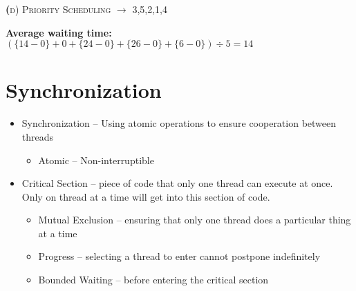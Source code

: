 \documentclass{article}
\newcommand{\smallcaps}[1]{\textsc{\textbf #1}\\}
\begin{document}
    \begin{center}
      \smallcaps{(d) Priority Scheduling $\to$ 3,5,2,1,4}

      \textbf{Average waiting time:} $(\{14 - 0\} + 0 + \{24 - 0\} + \{26 - 0\} + \{6 - 0\}) \div 5 = 14$ \\
    \end{center}

    \pagebreak

    \section*{Synchronization}

    \begin{itemize}
      \item {\color{blue} Synchronization} -- Using atomic operations to ensure cooperation between threads
      \begin{itemize}
        \item {\color{orange} Atomic} -- Non-interruptible
      \end{itemize}
      \item {\color{blue} Critical Section} -- piece of code that only one thread can execute at once. Only on thread at a time will get into this section of code.
      \begin{itemize}
        \item {\color{orange} Mutual Exclusion} -- ensuring that only one thread does a particular thing at a time
        \item {\color{orange} Progress} -- selecting a thread to enter cannot postpone indefinitely
        \item {\color{orange} Bounded Waiting} -- before entering the critical section
      \end{itemize}
    \end{itemize}
\end{document}
